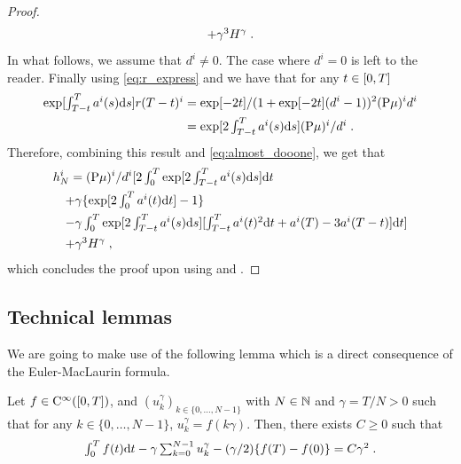 \begin{proof}
\begin{align}
  & \quad \textstyle{  + \gamma^3  H^\gamma \;. }  \label{eq:almost_dooone}
\end{align}
In what follows, we assume that $d^i \neq 0$. The case where $d^i = 0$ is left
to the reader.  Finally using \eqref{eq:r_express} and 
we have that for any $t \in \left[0,T\right]$
\begin{align}
  \textstyle{
  \exp[\int_{T - t}^{T} a^i(s) \mathrm{d}s ] r(T-t)^i} &= \exp[-2t] / (1 + \exp[-2t](d^i - 1))^2 (\mathrm{P} \mu)^i d^i \\
  &= \textstyle{ \exp[2 \int_{T - t}^{T} a^i(s) \mathrm{d}s ] (\mathrm{P}\mu)^i / d^i \;.
    }
\end{align}
Therefore, combining this result and \eqref{eq:almost_dooone}, we get that 
\begin{align}
  &h_N^i   = (\mathrm{P} \mu)^i/d^i [\textstyle{2 \int_0^T \exp[2 \int_{T-t}^{T} a^i(s) \mathrm{d}s] \mathrm{d}t} \\
  &\quad \textstyle{+ \gamma \{\exp[2 \int_{0}^{T} a^i(t) \mathrm{d}t] - 1\}}  \\
  & \quad  \textstyle{- \gamma \int_0^T \exp[2\int_{T-t}^T a^i(s) \mathrm{d}s] [\int_{T - t}^{T} a^i(t)^2 \mathrm{d}t + a^i(T) - 3 a^i(T - t)] \mathrm{d}t }] \\
  & \quad \textstyle{  + \gamma^3  H^\gamma \;, }  \label{eq:almost_doooone}
\end{align}
which concludes the proof upon using  and .
\end{proof}

\subsection{Technical lemmas}
\label{sec:technical-lemmas}

We are going to make use of the following lemma which is a direct consequence of
the Euler-MacLaurin formula.

\begin{proposition}
  \label{prop:maclaurin}
  Let $f \in \mathrm{C}^\infty(\left[0,T\right])$, and
  $(u_k^\gamma)_{k \in \{0, \dots, N-1\}}$ with $N \in \mathbb{N}$ and
  $\gamma = T/N > 0$ such that for any $k \in \{0, \dots, N-1\}$,
  $u_k^\gamma = f(k \gamma)$. Then, there exists $C \geq 0$ such that
  \begin{equation}
    \textstyle{
      \int_0^T f(t) \mathrm{d}t - \gamma \sum_{k=0}^{N-1} u_k^\gamma -  (\gamma/2) \{f(T) - f(0)\} =   C \gamma^2 \;.
      }
  \end{equation}
\end{proposition}

